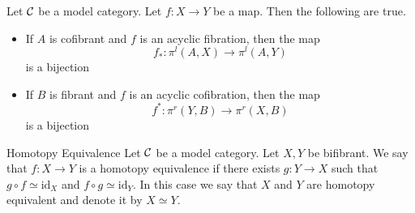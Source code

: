 \documentclass[a4paper]{article}
\begin{document}
\begin{lmm}{}{} Let $\mathcal{C}$ be a model category. Let $f:X\to Y$ be a map. Then the following are true. 
\begin{itemize}
\item If $A$ is cofibrant and $f$ is an acyclic fibration, then the map $$f_\ast:\pi^l(A,X)\to\pi^l(A,Y)$$ is a bijection
\item If $B$ is fibrant and $f$ is an acyclic cofibration, then the map $$f^\ast:\pi^r(Y,B)\to\pi^r(X,B)$$ is a bijection
\end{itemize}
\end{lmm}

\begin{defn}{Homotopy Equivalence}{} Let $\mathcal{C}$ be a model category. Let $X,Y$ be bifibrant. We say that $f:X\to Y$ is a homotopy equivalence if there exists $g:Y\to X$ such that $g\circ f\simeq\text{id}_X$ and $f\circ g\simeq\text{id}_Y$. In this case we say that $X$ and $Y$ are homotopy equivalent and denote it by $X\simeq Y$. 
\end{defn}
\end{document}
